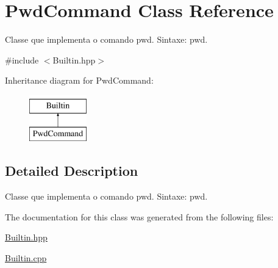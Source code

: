 \hypertarget{classPwdCommand}{
\section{PwdCommand Class Reference}
\label{classPwdCommand}
}


Classe que implementa o comando pwd. Sintaxe: pwd.  




{\ttfamily \#include $<$Builtin.hpp$>$}

Inheritance diagram for PwdCommand:\begin{figure}[H]
\begin{center}
\leavevmode
\includegraphics[height=2.000000cm]{classPwdCommand}
\end{center}
\end{figure}


\subsection{Detailed Description}
Classe que implementa o comando pwd. Sintaxe: pwd. 

The documentation for this class was generated from the following files:\begin{DoxyCompactItemize}
\item 
\hyperlink{Builtin_8hpp}{Builtin.hpp}\item 
\hyperlink{Builtin_8cpp}{Builtin.cpp}\end{DoxyCompactItemize}

